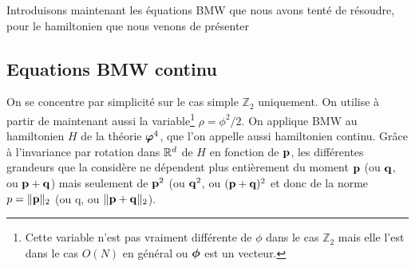 \documentclass[10.5pt]{article}
\begin{document}
\begin{multicols*}{2}
Introduisons maintenant les équations BMW que nous avons tenté de résoudre, pour le hamiltonien que nous venons de présenter
\\



\subsection{Equations BMW continu}


\vspace*{11pt}
On se concentre par simplicité sur le cas simple $\mathbb{Z}_2$ uniquement. On utilise à partir de maintenant aussi la variable\footnote{Cette variable n'est pas vraiment différente de $\phi$ dans le cas $\mathbb{Z}_2$ mais elle l'est dans le cas $O(N)$ en général ou $\boldsymbol{ \phi}$ est un vecteur.} $\rho = \phi^2/2$. On applique BMW au hamiltonien $H$ de la théorie $\boldsymbol{ \varphi}^4$, que l'on appelle aussi hamiltonien continu. Grâce à l'invariance par rotation dans $\mathbb{R}^d$ de $H$ en fonction de ${\bf p}$, les différentes grandeurs que la considère ne dépendent plus entièrement du moment ${\bf p}$ (ou ${\bf q}$, ou ${\bf p}+{\bf q}$) mais seulement de ${\bf p}^2$ (ou ${\bf q}^2$, ou $({\bf p}+{\bf q})^2$ et donc de la norme $p = \| {\bf p} \|_{2}$ (ou q, ou $\|{\bf p}+{\bf q}\|_2$). \\


\end{multicols*}
\end{document}
